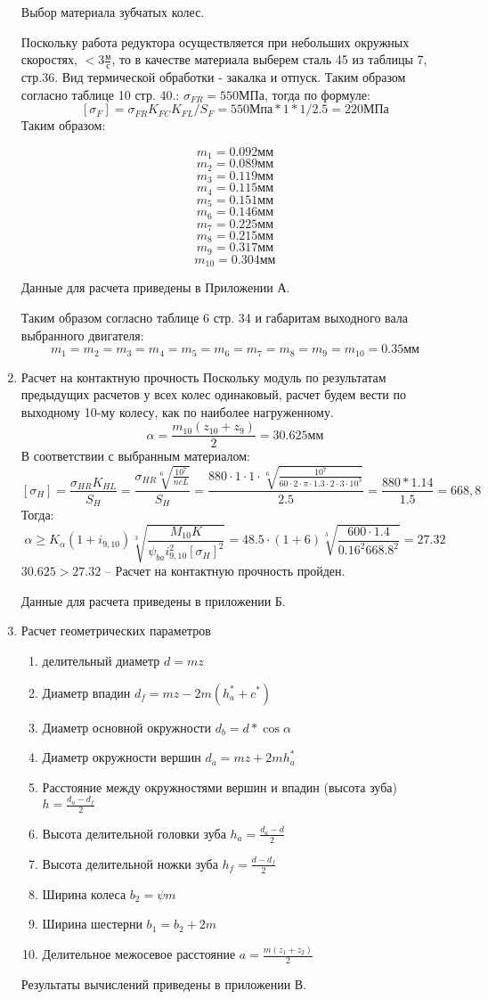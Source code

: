 \documentclass{article}
\begin{document}
\begin{enumerate}
	Выбор материала зубчатых колес.

	Поскольку работа редуктора осуществляется при небольших окружных скоростях, $ < 3 \frac{м}{с} $, то в качестве материала выберем сталь 45 из таблицы 7, стр.36. Вид термической обработки - закалка и отпуск.
	Таким образом согласно таблице 10 стр. 40.: $ \sigma_{FR} = 550 МПа$, тогда по формуле:
	$$
	[ \sigma_F] = \sigma_{FR} K_{FC} K_{FL} / S_F = 550 Мпа * 1 * 1 / 2.5 = 220 МПа
	$$
	Таким образом:

	$$
	m_1 = 0.092 мм
	$$
	$$
	m_2 = 0.089 мм
	$$
	$$
	m_3 = 0.119 мм
	$$
	$$
	m_4 = 0.115 мм
	$$
	$$
	m_5 = 0.151 мм
	$$
	$$
	m_6 = 0.146 мм
	$$
	$$
	m_7 = 0.225 мм
	$$
	$$
	m_8 = 0.215 мм
	$$
	$$
	m_9 = 0.317 мм
	$$
	$$
	m_{10} = 0.304 мм
	$$

	Данные для расчета приведены в Приложении А.

	Таким образом согласно таблице 6 стр. 34 и габаритам выходного вала выбранного двигателя:
	$$
	m_1 = m_2 = m_3 = m_4 = m_5 = m_6 = m_7 = m_8 = m_9 = m_{10} = 0.35 мм
	$$
	\item Расчет на контактную прочность
	Поскольку модуль по результатам предыдущих расчетов у всех колес одинаковый, расчет будем вести по выходному 10-му колесу, как по наиболее нагруженному.
	$$
	\alpha = \frac{m_{10} (z_{10} + z_9)}{2} = 30.625 мм 
	$$
	В соответствии с выбранным материалом:
	$$
	[ \sigma_H] = \frac{\sigma_{HR} K_{HL} }{S_{H}} = \frac{ \sigma_{HR} \sqrt[6]{ \frac{10^7}{n c L} }}{S_{H}} = \frac{880 \cdot 1 \cdot 1 \cdot \sqrt[6]{ \frac{10^7}{60 \cdot 2 \cdot \pi \cdot 1.3 \cdot 2 \cdot 3 \cdot 10^3} }}{2.5} = \frac{880 * 1.14}{1.5} = 668,8
	$$
	Тогда:
	$$
	\alpha \ge K_{ \alpha} (1 + i_{9,10})\sqrt[3]{\frac{M_{10} K}{\psi_{ba} i_{9,10}^2 [ \sigma_H]^2}} = 48.5 \cdot (1 + 6) \sqrt[3]{\frac{600 \cdot 1.4}{0.1 6^2 668.8^2}} = 27.32
	$$
	$30.625 > 27.32$ -- Расчет на контактную прочность пройден.

	Данные для расчета приведены в приложении Б.

	\item Расчет геометрических параметров
	\begin{enumerate}
		\item делительный диаметр $d = m z$
		\item Диаметр впадин $d_f = m z - 2 m (h_a^* + c^*)$
		\item Диаметр основной окружности $d_b = d * \cos{ \alpha}$
		\item Диаметр окружности вершин $d_a = m z + 2 m h_a^*$
		\item Расстояние между окружностями вершин и впадин (высота зуба) $h = \frac{d_a - d_f}{2}$
		\item Высота делительной головки зуба $h_a = \frac{d_a - d}{2} $
		\item Высота делительной ножки зуба $h_f = \frac {d - d_f}{2}$
		\item Ширина колеса $b_2 = \psi m$
		\item Ширина шестерни $b_1 = b_2 + 2 m$
		\item Делительное межосевое расстояние $a = \frac{m (z_1 + z_2)}{2} $
	\end{enumerate}
	Результаты вычислений приведены в приложении В.


\end{enumerate}
\end{document}
